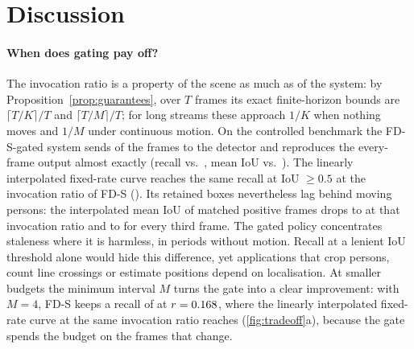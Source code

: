 \documentclass[12pt,a4paper]{article}
\theoremstyle{plain}
\theoremstyle{definition}
\newcommand{\code}[1]{\texttt{#1}}
\newcommand{\FDS}{FD-S}
\begin{document}
\begin{table}[t]
\centering\small
\caption{Real video (\code{vtest.avi}, \VtFrames{} frames): agreement with YOLOv8m run on every frame ($K=10$).}
\label{tab:video}

\end{table}


\clearpage

\section{Discussion}\label{sec:discussion}

\paragraph{When does gating pay off?} The invocation ratio is a property of the scene as much as of the system: by Proposition~\ref{prop:guarantees}, over $T$ frames its exact finite-horizon bounds are $\lceil T/K\rceil/T$ and $\lceil T/M\rceil/T$; for long streams these approach $1/K$ when nothing moves and $1/M$ under continuous motion. On the controlled benchmark the \FDS-gated system sends \PolRatioFDS{} of the frames to the detector and reproduces the every-frame output almost exactly (recall \PolRecallFDS{} vs.\ \PolRecallEvery, mean IoU \PolIouFDS{} vs.\ \PolIouEvery). The linearly interpolated fixed-rate curve reaches the same recall at IoU $\ge0.5$ at the invocation ratio of \FDS{} (\FixedRecallAtFDS). Its retained boxes nevertheless lag behind moving persons: the interpolated mean IoU of matched positive frames drops to \FixedIouAtFDS{} at that invocation ratio and to \PolIouFixedThree{} for every third frame. The gated policy concentrates staleness where it is harmless, in periods without motion. Recall at a lenient IoU threshold alone would hide this difference, yet applications that crop persons, count line crossings or estimate positions depend on localisation. At smaller budgets the minimum interval $M$ turns the gate into a clear improvement: with $M=4$, \FDS{} keeps a recall of \PolRecallFDSMFour{} at $r=0.168$, where the linearly interpolated fixed-rate curve at the same invocation ratio reaches \FixedRecallAtFDSMFour{} (\cref{fig:tradeoff}a), because the gate spends the budget on the frames that change.
\end{document}
